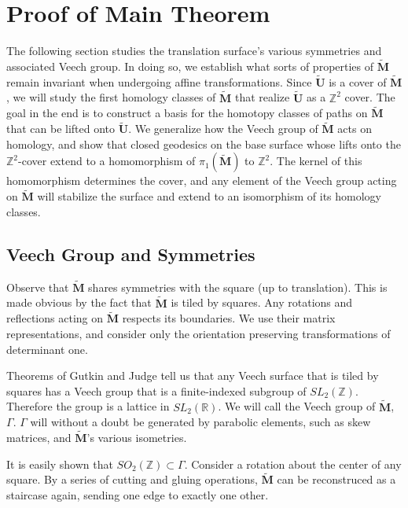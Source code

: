 \documentclass[]{article}
\begin{document}
\section{Proof of Main Theorem}
The following section studies the translation surface's various symmetries and associated Veech group. In doing so, we establish what sorts of properties of $\tilde{\mathbf{M}}$ remain invariant when undergoing affine transformations. Since $\tilde{\mathbf{U}}$ is a cover of $\tilde{\mathbf{M}}$, we will study the first homology classes of $\tilde{\mathbf{M}}$ that realize $\tilde{\mathbf{U}}$ as a $\mathbb{Z}^2$ cover. The goal in the end is to construct a basis for the homotopy classes of paths on $\tilde{\mathbf{M}}$ that can be lifted onto $\tilde{\mathbf{U}}$. We generalize how the Veech group of $\tilde{\mathbf{M}}$ acts on homology, and show that closed geodesics on the base surface whose lifts onto the $\mathbb{Z}^2$-cover extend to a homomorphism of $\pi_1(\tilde{\mathbf{M}})$ to $\mathbb{Z}^2$. The kernel of this homomorphism determines the cover, and any element of the Veech group acting on $\tilde{\mathbf{M}}$ will stabilize the surface and extend to an isomorphism of its homology classes.

\subsection{Veech Group and Symmetries}
Observe that $\tilde{\mathbf{M}}$ shares symmetries with the square (up to translation). This is made obvious by the fact that $\tilde{\mathbf{M}}$ is tiled by squares. Any rotations and reflections acting on $\tilde{\mathbf{M}}$ respects its boundaries. We use their matrix representations, and consider only the orientation preserving transformations of determinant one.

Theorems of Gutkin and Judge tell us that any Veech surface that is tiled by squares has a Veech group that is a finite-indexed subgroup of $SL_2(\mathbb Z)$. Therefore the group is a lattice in $SL_2(\mathbb R)$. We will call the Veech group of $\tilde{\mathbf{M}}$, $\Gamma$. $\Gamma$ will without a doubt be generated by parabolic elements, such as skew matrices, and $\tilde{\mathbf{M}}$'s various isometries. 

It is easily shown that $SO_2(\mathbb Z)\subset\Gamma$. Consider a rotation about the center of any square. By a series of cutting and gluing operations, $\tilde{\mathbf{M}}$ can be reconstruced as a staircase again, sending one edge to exactly one other.
\end{document}
